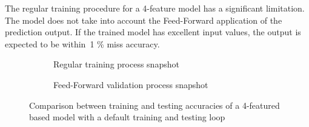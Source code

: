 The regular training procedure for a 4-feature model has a significant limitation. The model does not take into account the Feed-Forward application of the prediction output.
If the trained model has excellent input values, the output is expected to be within~1 \% miss accuracy.
\begin{figure}[htbp]
    \centering
    \begin{subfigure}[b]{\columnwidth}
        \centering
        
        \caption{Regular training process snapshot}
        \label{subfig:regular_tr}
    \end{subfigure}
    \hfill
    \begin{subfigure}[b]{\columnwidth}
        \centering
        
        \caption{Feed-Forward validation process snapshot}
        \label{subfig:regular_ts}
    \end{subfigure}
    \caption{Comparison between training and testing accuracies of a 4-featured based model with a default training and testing loop}
    \label{fig:regular_tr}
\end{figure}

